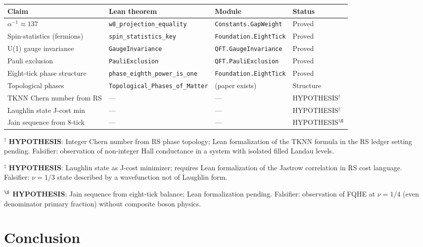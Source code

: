 \documentclass[12pt,a4paper]{article}
\theoremstyle{definition}
\theoremstyle{remark}
\begin{document}
\begin{center}
\begin{tabular}{llll}
\toprule
Claim & Lean theorem & Module & Status \\
\midrule
$\alpha^{-1} \approx 137$ & \texttt{w8\_projection\_equality} & \texttt{Constants.GapWeight} & Proved \\
Spin-statistics (fermions) & \texttt{spin\_statistics\_key} & \texttt{Foundation.EightTick} & Proved \\
U(1) gauge invariance & \texttt{GaugeInvariance} & \texttt{QFT.GaugeInvariance} & Proved \\
Pauli exclusion & \texttt{PauliExclusion} & \texttt{QFT.PauliExclusion} & Proved \\
Eight-tick phase structure & \texttt{phase\_eighth\_power\_is\_one} & \texttt{Foundation.EightTick} & Proved \\
Topological phases & \texttt{Topological\_Phases\_of\_Matter} & (paper exists) & Structure \\
\midrule
TKNN Chern number from RS & --- & --- & HYPOTHESIS$^\dagger$ \\
Laughlin state J-cost min & --- & --- & HYPOTHESIS$^\ddagger$ \\
Jain sequence from 8-tick & --- & --- & HYPOTHESIS$^\S$ \\
\bottomrule
\end{tabular}
\end{center}

$^\dagger$ \textbf{HYPOTHESIS}: Integer Chern number from RS phase
topology; Lean formalization of the TKNN formula in the RS ledger setting
pending.  Falsifier: observation of non-integer Hall conductance in a
system with isolated filled Landau levels.

$^\ddagger$ \textbf{HYPOTHESIS}: Laughlin state as J-cost minimizer;
requires Lean formalization of the Jastrow correlation in RS cost language.
Falsifier: $\nu = 1/3$ state described by a wavefunction not of Laughlin
form.

$^\S$ \textbf{HYPOTHESIS}: Jain sequence from eight-tick balance;
Lean formalization pending.  Falsifier: observation of FQHE at $\nu = 1/4$
(even denominator primary fraction) without composite boson physics.

\section{Conclusion}
\label{sec:conclusion}
\end{document}
